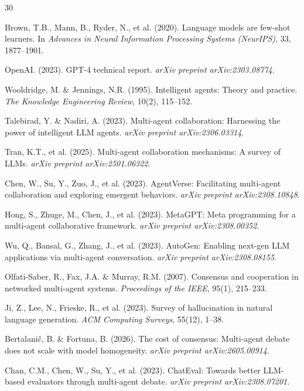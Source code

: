 \documentclass[12pt,a4paper]{article}
\begin{document}
\begin{thebibliography}{30}

Brown, T.B., Mann, B., Ryder, N., et al. (2020). Language models are few-shot learners. In \textit{Advances in Neural Information Processing Systems (NeurIPS)}, 33, 1877--1901.

OpenAI. (2023). GPT-4 technical report. \textit{arXiv preprint arXiv:2303.08774}.

Wooldridge, M. \& Jennings, N.R. (1995). Intelligent agents: Theory and practice. \textit{The Knowledge Engineering Review}, 10(2), 115--152.

Talebirad, Y. \& Nadiri, A. (2023). Multi-agent collaboration: Harnessing the power of intelligent LLM agents. \textit{arXiv preprint arXiv:2306.03314}.

Tran, K.T., et al. (2025). Multi-agent collaboration mechanisms: A survey of LLMs. \textit{arXiv preprint arXiv:2501.06322}.

Chen, W., Su, Y., Zuo, J., et al. (2023). AgentVerse: Facilitating multi-agent collaboration and exploring emergent behaviors. \textit{arXiv preprint arXiv:2308.10848}.

Hong, S., Zhuge, M., Chen, J., et al. (2023). MetaGPT: Meta programming for a multi-agent collaborative framework. \textit{arXiv preprint arXiv:2308.00352}.

Wu, Q., Bansal, G., Zhang, J., et al. (2023). AutoGen: Enabling next-gen LLM applications via multi-agent conversation. \textit{arXiv preprint arXiv:2308.08155}.

Olfati-Saber, R., Fax, J.A. \& Murray, R.M. (2007). Consensus and cooperation in networked multi-agent systems. \textit{Proceedings of the IEEE}, 95(1), 215--233.

Ji, Z., Lee, N., Frieske, R., et al. (2023). Survey of hallucination in natural language generation. \textit{ACM Computing Surveys}, 55(12), 1--38.

Bertalani\v{c}, B. \& Fortuna, B. (2026). The cost of consensus: Multi-agent debate does not scale with model homogeneity. \textit{arXiv preprint arXiv:2605.00914}.

Chan, C.M., Chen, W., Su, Y., et al. (2023). ChatEval: Towards better LLM-based evaluators through multi-agent debate. \textit{arXiv preprint arXiv:2308.07201}.


\end{thebibliography}
\end{document}
